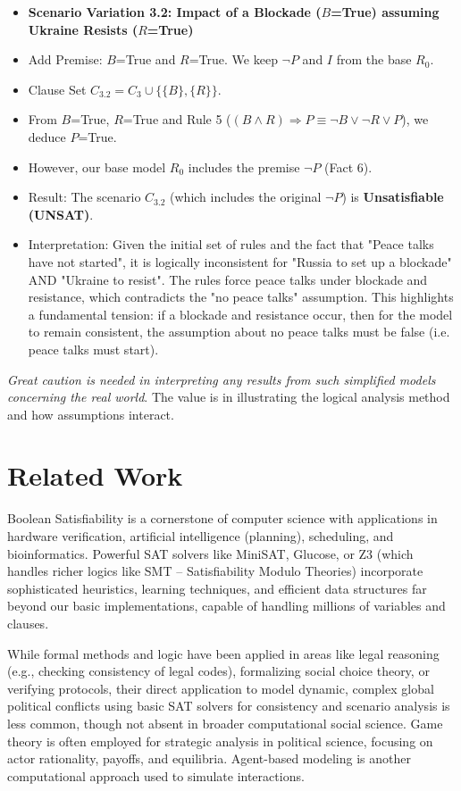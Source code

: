 \documentclass[11pt, a4paper]{article}
\begin{document}
\begin{itemize}
    \item \textbf{Scenario Variation 3.2: Impact of a Blockade ($B$=True) assuming Ukraine Resists ($R$=True)}
        \item Add Premise: $B$=True and $R$=True. We keep $\neg P$ and $I$ from the base $R_0$.
        \item Clause Set $C_{3.2} = C_3 \cup \{\{B\}, \{R\}\}$.
        \item From $B$=True, $R$=True and Rule 5 ($(B \wedge R) \Rightarrow P \equiv \neg B \vee \neg R \vee P$), we deduce $P$=True.
        \item However, our base model $R_0$ includes the premise $\neg P$ (Fact 6).
        \item Result: The scenario $C_{3.2}$ (which includes the original $\neg P$) is \textbf{Unsatisfiable (UNSAT)}.
        \item Interpretation: Given the initial set of rules and the fact that "Peace talks have not started", it is logically inconsistent for "Russia to set up a blockade" AND "Ukraine to resist". The rules force peace talks under blockade and resistance, which contradicts the "no peace talks" assumption. This highlights a fundamental tension: if a blockade and resistance occur, then for the model to remain consistent, the assumption about no peace talks must be false (i.e. peace talks must start).
\end{itemize}
\textit{Great caution is needed in interpreting any results from such simplified models concerning the real world}. The value is in illustrating the logical analysis method and how assumptions interact.

\section{Related Work} \label{sec:relatedwork}

Boolean Satisfiability is a cornerstone of computer science with applications in hardware verification, artificial intelligence (planning), scheduling, and bioinformatics. Powerful SAT solvers like MiniSAT, Glucose, or Z3 (which handles richer logics like SMT – Satisfiability Modulo Theories) incorporate sophisticated heuristics, learning techniques, and efficient data structures far beyond our basic implementations, capable of handling millions of variables and clauses.

While formal methods and logic have been applied in areas like legal reasoning (e.g., checking consistency of legal codes), formalizing social choice theory, or verifying protocols, their direct application to model dynamic, complex global political conflicts using basic SAT solvers for consistency and scenario analysis is less common, though not absent in broader computational social science. Game theory is often employed for strategic analysis in political science, focusing on actor rationality, payoffs, and equilibria. Agent-based modeling is another computational approach used to simulate interactions.
\end{document}
